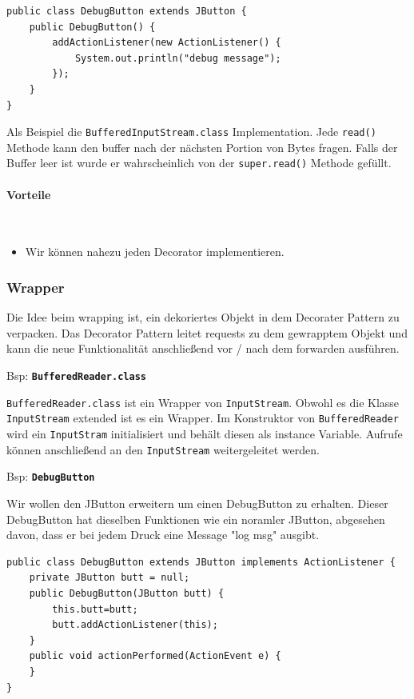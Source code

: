 	\begin{lstlisting}[style=JavaG, caption=Decorator Pattern Inheritance \cite{decoratorDebug}]
public class DebugButton extends JButton {
	public DebugButton() {
		addActionListener(new ActionListener() {
			System.out.println("debug message");
		});
	}
}
	\end{lstlisting}
	
	Als Beispiel die \texttt{BufferedInputStream.class} Implementation.
	Jede \texttt{read()} Methode kann den buffer nach der nächsten Portion von Bytes fragen. Falls der Buffer leer ist wurde er wahrscheinlich von der \texttt{super.read()} Methode gefüllt.
	
	\paragraph{Vorteile}\mbox{}\\
	\begin{itemize}
		\item Wir können nahezu jeden Decorator implementieren.
	\end{itemize}
	
	
	\subsubsection{Wrapper \cite{decoratorDebug}}
	Die Idee beim wrapping ist, ein dekoriertes Objekt in dem Decorater Pattern zu verpacken. Das Decorator Pattern leitet requests zu dem gewrapptem Objekt und kann die neue Funktionalität anschließend vor / nach dem forwarden ausführen.
	
	Bsp: \textbf{\texttt{BufferedReader.class}}
	
	\texttt{BufferedReader.class} ist ein Wrapper von \texttt{InputStream}.
	Obwohl es die Klasse \texttt{InputStream} extended ist es ein Wrapper.
	Im Konstruktor von \texttt{BufferedReader} wird ein \texttt{InputStram} initialisiert und behält diesen als instance Variable. Aufrufe können anschließend an den \texttt{InputStream} weitergeleitet werden.
	
	Bsp: \textbf{\texttt{DebugButton}}
	
	Wir wollen den JButton erweitern um einen DebugButton zu erhalten.
	Dieser DebugButton hat dieselben Funktionen wie ein noramler JButton, abgesehen davon, dass er bei jedem Druck eine Message "log msg" ausgibt.
	
\clearpage
	
	\begin{lstlisting}[style=JavaG, caption=Decorator - Wrapper \cite{decoratorDebug}]
public class DebugButton extends JButton implements ActionListener {
	private JButton butt = null;
	public DebugButton(JButton butt) {
		this.butt=butt;
		butt.addActionListener(this);
	}
	public void actionPerformed(ActionEvent e) {
	}
}	
	\end{lstlisting}
	
